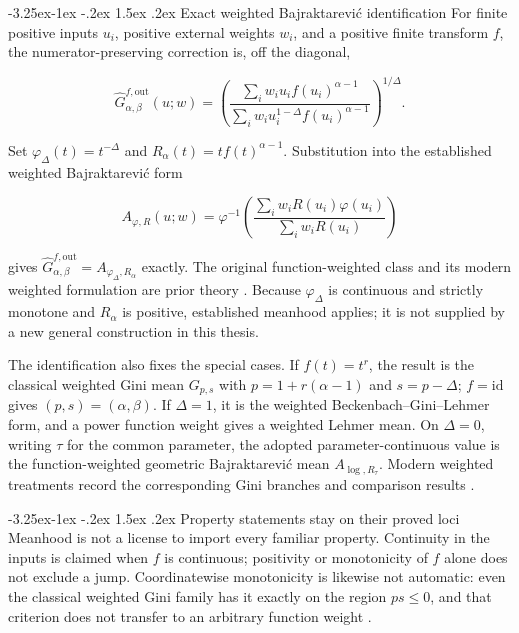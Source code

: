 \documentclass[12pt,a4paper,oneside]{report}
\makeatletter
\renewcommand\subsection{\@startsection{subsection}{2}{\z@}%
  {-3.25ex\@plus -1ex \@minus -.2ex}%
  {1.5ex \@plus .2ex}%
  {\normalfont\fontsize{12}{15}\selectfont\bfseries}}
\makeatother
\begin{document}
\subsection{Exact weighted Bajraktarevi\'c identification}
\label{sec:lit-mean-family-identification}
For finite positive inputs $u_i$, positive external weights $w_i$, and a
positive finite transform $f$, the numerator-preserving correction is, off the
diagonal,

\[
 \widehat G_{\alpha,\beta}^{f,\mathrm{out}}(u;w)
 =\left(
 \frac{\sum_i w_i u_i f(u_i)^{\alpha-1}}
      {\sum_i w_i u_i^{1-\Delta}f(u_i)^{\alpha-1}}
 \right)^{1/\Delta}.
\]

Set $\varphi_\Delta(t)=t^{-\Delta}$ and
$R_\alpha(t)=t f(t)^{\alpha-1}$.
Substitution into the established weighted Bajraktarevi\'c form

\[
 A_{\varphi,R}(u;w)=\varphi^{-1}\!\left(
   \frac{\sum_i w_iR(u_i)\varphi(u_i)}{\sum_i w_iR(u_i)}
 \right)
\]

gives $\widehat G_{\alpha,\beta}^{f,\mathrm{out}}
=A_{\varphi_\Delta,R_\alpha}$ exactly. The original function-weighted class and
its modern weighted formulation are prior theory
\citep{bajraktarevic1958,paleszakaria2020}. Because $\varphi_\Delta$ is continuous
and strictly monotone and $R_\alpha$ is positive, established meanhood applies;
it is not supplied by a new general construction in this thesis.

The identification also fixes the special cases. If $f(t)=t^r$, the result is
the classical weighted Gini mean $G_{p,s}$ with
$p=1+r(\alpha-1)$ and $s=p-\Delta$; $f=\mathrm{id}$ gives
$(p,s)=(\alpha,\beta)$. If $\Delta=1$, it is the weighted
Beckenbach--Gini--Lehmer form, and a power function weight gives a weighted
Lehmer mean. On $\Delta=0$, writing $\tau$ for the common parameter, the
adopted parameter-continuous value is the function-weighted geometric
Bajraktarevi\'c mean $A_{\log,R_\tau}$. Modern
weighted treatments record the corresponding Gini branches and comparison
results \citep{lehmer1971,chuzhao2015,matkowskiwrobel2020,
palespasteczka2018,palespasteczka2024}.

\subsection{Property statements stay on their proved loci}
\label{sec:lit-mean-property-boundaries}
Meanhood is not a license to import every familiar property. Continuity in
the inputs is claimed when $f$ is continuous; positivity or monotonicity of
$f$ alone does not exclude a jump. Coordinatewise monotonicity is likewise
not automatic: even the classical weighted Gini family has it exactly on the
region $ps\leq0$, and that criterion does not transfer to an arbitrary
function weight \citep{palespasteczka2024}.
\end{document}
